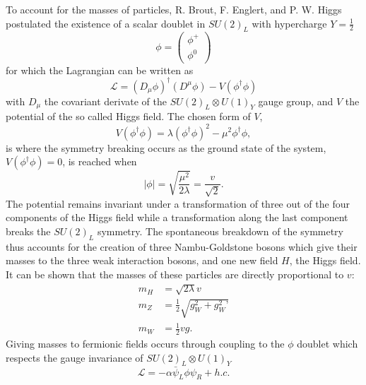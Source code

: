     To account for the masses of particles, R. Brout, F. Englert, and P. W. Higgs postulated the existence of a scalar doublet in $ SU(2)_L $ with hypercharge $ Y = \frac{1}{2} $
    \begin{equation}
      \phi = \left( \begin{matrix} \phi^+ \\ \phi^0 \end{matrix} \right)
    \end{equation}
    for which the Lagrangian can be written as
    \begin{equation}
      \mathcal{L} = \left( D_\mu \phi \right)^\dagger \left( D^\mu \phi \right) - V(\phi^\dagger \phi)
    \end{equation}
    with $ D_\mu $ the covariant derivate of the $ SU(2)_L \otimes U(1)_Y $ gauge group, and $ V $ the potential of the so called Higgs field. The chosen form of $ V $,
    \begin{equation}
      V(\phi^\dagger \phi) = \lambda \left( \phi^\dagger \phi \right)^2 - \mu^2 \phi^\dagger \phi ,
    \end{equation}
    is where the symmetry breaking occurs as the ground state of the system, $ V(\phi^\dagger \phi) = 0 $, is reached when
    \begin{equation}
      \left| \phi \right| = \sqrt{\frac{\mu^2}{2 \lambda}} = \frac{v}{\sqrt{2}} .
    \end{equation}
    The potential remains invariant under a transformation of three out of the four components of the Higgs field while a transformation along the last component breaks the $ SU(2)_L $ symmetry. The spontaneous breakdown of the symmetry thus accounts for the creation of three Nambu-Goldstone bosons which give their masses to the three weak interaction bosons, and one new field $ H $, the Higgs field. It can be shown that the masses of these particles are directly proportional to $ v $:
    \begin{align}
      m_H & = \sqrt{2 \lambda} v \\
      m_Z & = \frac{1}{2} \sqrt{g_W^2 + g_W^2\text{'}} \\
      m_W & = \frac{1}{2} v g .
    \end{align}
    Giving masses to fermionic fields occurs through coupling to the $ \phi $ doublet which respects the gauge invariance of $ SU(2)_L \otimes U(1)_Y $
    \begin{equation}
      \mathcal{L} = - \alpha \bar{\psi}_L \phi \psi_R + h.c.
    \end{equation} \\

